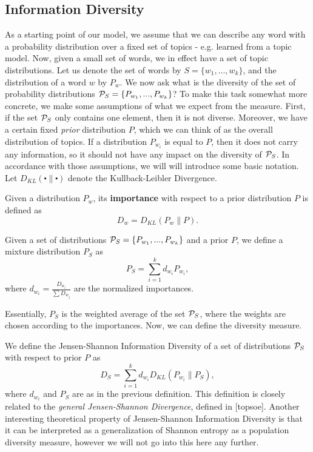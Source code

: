\subsection{Information Diversity}
As a starting point of our model, we assume that we can describe any
word with a probability distribution over a fixed set of topics -
e.g. learned from a topic model. Now, given a small
set of words, we in effect have a set of topic distributions. Let us
denote the set of words by $S=\{w_1,...,w_k\}$, and the distribution
of a word $w$ by $P_w$.  We now ask
what is the diversity of the set of probability
distributions ${\mathcal P}_S=\{P_{w_1},...,P_{w_k}\}$? To make this task
somewhat more concrete, we make some 
assumptions of what we expect from the measure. First, if the set
${\mathcal P}_S$ only contains one element, then it is not diverse. Moreover,
we have a certain fixed {\em prior} distribution $P$, which we
can think of as the overall distribution of topics. If a distribution
$P_{w_i}$ is equal to $P$, then it does not carry any information, so
it should not have any impact on the diversity of ${\mathcal P}_S$. In
accordance with those assumptions, we will will introduce some basic
notation. Let $D_{KL}(\centerdot\|\centerdot)$ denote the
Kullback-Leibler Divergence.

\bed
Given a distribution $P_w$, its {\bf importance} with respect to a
prior distribution $P$ is defined as 
\[D_w = D_{KL}(P_w\|P).\]
\eed

\bed\label{mixture}
Given a set of distributions ${\mathcal P}_S=\{P_{w_1},...,P_{w_k}\}$ and a
prior $P$, we
define a mixture distribution $P_S$ as
\[P_S=\sum_{i=1}^k d_{w_i} P_{w_i},\]
where $d_{w_i}=\frac{D_{w_i}}{\sum D_{w_j}}$ are the normalized
importances.
\eed

Essentially, $P_S$ is the weighted average of the set ${\mathcal P}_S$, where
the weights are chosen according to the importances. Now, we can
define the diversity measure.

\bed\label{diversity}
We define the Jensen-Shannon Information Diversity of a set of
distributions ${\mathcal P}_S$ with respect to 
prior $P$ as
\[D_S=\sum_{i=1}^k d_{w_i}D_{KL}(P_{w_i}\|P_S), \]
where $d_{w_i}$ and $P_S$ are as in the previous definition.
\eed
This definition is closely related to the 
{\em general Jensen-Shannon Divergence}, defined in [topsoe]. Another
interesting theoretical property of Jensen-Shannon Information
Diversity is that it can be interpreted as a generalization of Shannon
entropy as a population diversity measure, however we will not go
into this here any further. 

